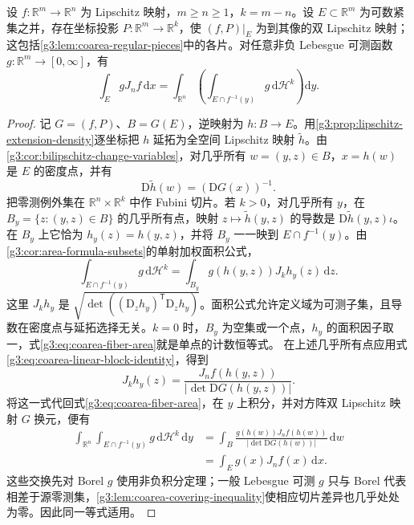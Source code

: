 \begin{lemma}\label{g3:lem:coarea-on-bilipschitz-piece}
	设 \(f:\mathbb R^m\to\mathbb R^n\) 为 Lipschitz 映射，\(m\ge n\ge1\)，\(k=m-n\)。设 \(E\subset\mathbb R^m\) 为可数紧集之并，存在坐标投影 \(P:\mathbb R^m\to\mathbb R^k\)，使 \((f,P)|_E\) 为到其像的双 Lipschitz 映射；这包括\cref{g3:lem:coarea-regular-pieces}中的各片。对任意非负 Lebesgue 可测函数 \(g:\mathbb R^m\to[0,\infty]\)，有
	\[
		\int_EgJ_nf\,\mathrm dx
		=\int_{\mathbb R^n}\left(\int_{E\cap f^{-1}(y)}g\,\mathrm d\mathcal H^k\right)\mathrm dy.
	\]
\end{lemma}
\begin{proof}
	记 \(G=(f,P)\)、\(B=G(E)\)，逆映射为 \(h:B\to E\)。用\cref{g3:prop:lipschitz-extension-density}逐坐标把 \(h\) 延拓为全空间 Lipschitz 映射 \(\widetilde h\)。由\cref{g3:cor:bilipschitz-change-variables}，对几乎所有 \(w=(y,z)\in B\)，\(x=h(w)\) 是 \(E\) 的密度点，并有
	\[
		\mathrm D\widetilde h(w)=(\mathrm DG(x))^{-1}.
	\]
	把零测例外集在 \(\mathbb R^n\times\mathbb R^k\) 中作 Fubini 切片。若 \(k>0\)，对几乎所有 \(y\)，在 \(B_y=\{z:(y,z)\in B\}\) 的几乎所有点，映射 \(z\mapsto\widetilde h(y,z)\) 的导数是 \(\mathrm D\widetilde h(y,z)\iota\)。在 \(B_y\) 上它恰为 \(h_y(z)=h(y,z)\)，并将 \(B_y\) 一一映到 \(E\cap f^{-1}(y)\)。由\cref{g3:cor:area-formula-subsets}的单射加权面积公式，
	\begin{equation}\label{g3:eq:coarea-fiber-area}
		\int_{E\cap f^{-1}(y)}g\,\mathrm d\mathcal H^k
		=\int_{B_y}g(h(y,z))J_kh_y(z)\,\mathrm dz.
	\end{equation}
	这里 \(J_kh_y\) 是 \(\sqrt{\det((\mathrm D_zh_y)^{\mathsf T}\mathrm D_zh_y)}\)。面积公式允许定义域为可测子集，且导数在密度点与延拓选择无关。\(k=0\) 时，\(B_y\) 为空集或一个点，\(h_y\) 的面积因子取一，式\eqref{g3:eq:coarea-fiber-area}就是单点的计数恒等式。
	在上述几乎所有点应用式\eqref{g3:eq:coarea-linear-block-identity}，得到
	\[
		J_kh_y(z)=\frac{J_nf(h(y,z))}{|\det\mathrm DG(h(y,z))|}.
	\]
	将这一式代回式\eqref{g3:eq:coarea-fiber-area}，在 \(y\) 上积分，并对方阵双 Lipschitz 映射 \(G\) 换元，便有
	\[
		\begin{aligned}
		\int_{\mathbb R^n}\int_{E\cap f^{-1}(y)}g\,\mathrm d\mathcal H^k\,\mathrm dy
		&=\int_B\frac{g(h(w))J_nf(h(w))}{|\det\mathrm DG(h(w))|}\,\mathrm dw\\
		&=\int_Eg(x)J_nf(x)\,\mathrm dx.
		\end{aligned}
	\]
	这些交换先对 Borel \(g\) 使用非负积分定理；一般 Lebesgue 可测 \(g\) 只与 Borel 代表相差于源零测集，\cref{g3:lem:coarea-covering-inequality}使相应切片差异也几乎处处为零。因此同一等式适用。
\end{proof}

